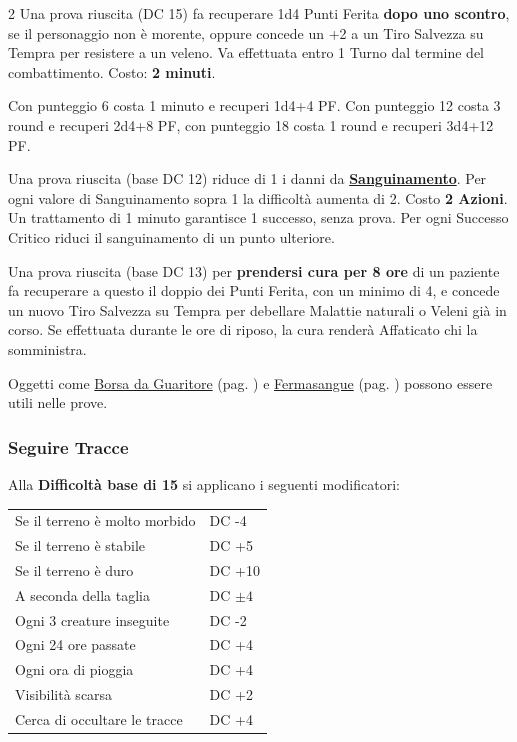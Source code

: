 \begin{multicols}{2}
Una prova riuscita (DC 15) fa recuperare 1d4 Punti Ferita \textbf{dopo uno scontro}, se il personaggio non è morente, oppure concede un +2 a un Tiro Salvezza su Tempra per resistere a un veleno. Va effettuata entro 1 Turno dal termine del combattimento. Costo: \textbf{2 minuti}.

Con punteggio 6 costa 1 minuto e recuperi 1d4+4 PF. Con punteggio 12 costa 3 round e recuperi 2d4+8 PF, con punteggio 18 costa 1 round e recuperi 3d4+12 PF.

Una prova riuscita (base DC 12) riduce di 1 i danni da \hyperlink{sanguinamento}{\textbf{Sanguinamento}}. Per ogni valore di Sanguinamento sopra 1 la difficoltà aumenta di 2. Costo \textbf{2 Azioni}. Un trattamento di 1 minuto garantisce 1 successo, senza prova. Per ogni Successo Critico riduci il sanguinamento di un punto ulteriore.

Una prova riuscita (base DC 13) per \textbf{prendersi cura per 8 ore} di un paziente fa recuperare a questo il doppio dei Punti Ferita, con un minimo di 4, e concede un nuovo Tiro Salvezza su Tempra per debellare Malattie naturali o Veleni già in corso.
Se effettuata durante le ore di riposo, la cura renderà Affaticato chi la somministra.

Oggetti come \hyperlink{borsadaguaritore}{Borsa da Guaritore} (pag. \pageref{borsadaguaritore}) e \hyperlink{Fermasangue}{Fermasangue} (pag. \pageref{fermasangue}) possono essere utili nelle prove.

\titlespacing*{\subsubsection}{0pt}{0.5em}{0.5em}\subsubsection*{Seguire Tracce}\label{seguiretracce}

Alla \textbf{Difficoltà base di 15} si applicano i seguenti modificatori:

\medskip

\noindent\begin{tabularx}{\linewidth}{ll}
 \rowcolor{gray!20}Se il terreno è molto morbido& DC -4\\
	Se il terreno è stabile& DC +5\\
 \rowcolor{gray!20}Se il terreno è duro& DC +10\\
	A seconda della taglia& DC $\pm4$\\
 \rowcolor{gray!20}Ogni 3 creature inseguite& DC -2\\
	Ogni 24 ore passate& DC +4\\
 \rowcolor{gray!20}Ogni ora di pioggia& DC +4\\
	Visibilità scarsa& DC +2\\
 \rowcolor{gray!20}Cerca di occultare le tracce& DC +4
\end{tabularx}


\end{multicols}
